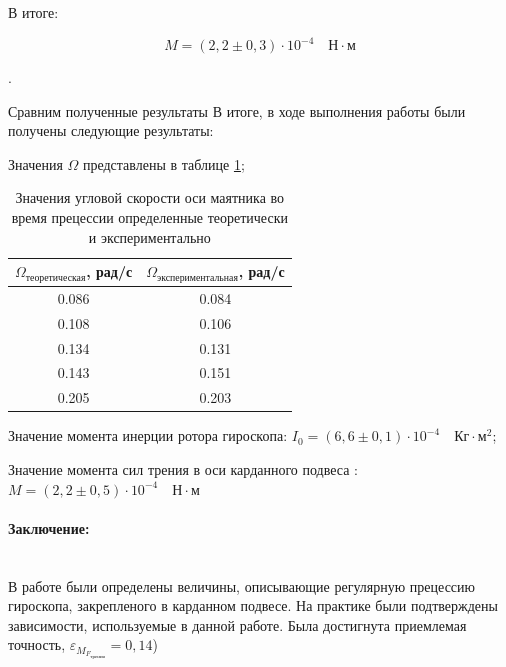 \documentclass[a4paper, 12pt]{article}
\newcommand{\parag}[1]{\paragraph*{#1:}}
\newcounter{Points}
\newcommand{\point}{\arabic{Points}. \addtocounter{Points}{1}}
\begin{document}
В итоге:

\begin{equation}
	M = (2,2 \pm 0,3)\cdot 10^{-4}\quad \text{Н}\cdot\text{м}
\end{equation}

\point Сравним полученные результаты 
В итоге, в ходе выполнения работы были получены следующие результаты:

Значения $\Omega$ представлены в таблице \ref{tab:final_table};

\begin{table}[h!]
\centering
\begin{tabular}{|c|c|}
\hline
$\Omega_{\text{теоретическая}}$, рад/с & $\Omega_{\text{экспериментальная}}$, рад/с \\ \hline
0.086 & 0.084 \\ \hline
0.108 & 0.106 \\ \hline
0.134 & 0.131 \\ \hline
0.143 & 0.151 \\ \hline
0.205 & 0.203 \\ \hline
\end{tabular}
\caption{Значения угловой скорости оси маятника во время прецессии определенные теоретически и экспериментально}
\label{tab:final_table}
\end{table}
 
Значение момента инерции ротора гироскопа: $I_{0} = \left(6,6 \pm 0,1 \right) \cdot 10^{-4}\quad \text{Кг} \cdot \text{м}^{2}$;

Значение момента сил трения в оси карданного подвеса : $M = (2,2 \pm 0,5)\cdot 10^{-4}\quad \text{Н}\cdot\text{м}$

\parag {Заключение} ~\\
В работе были определены величины, описывающие регулярную прецессию гироскопа, закрепленого в карданном подвесе. На практике были подтверждены зависимости, используемые в данной работе. Была достигнута приемлемая точность,  $\varepsilon_{M_{F_{\text{трения}}}} = 0,14$)
\end{document}
